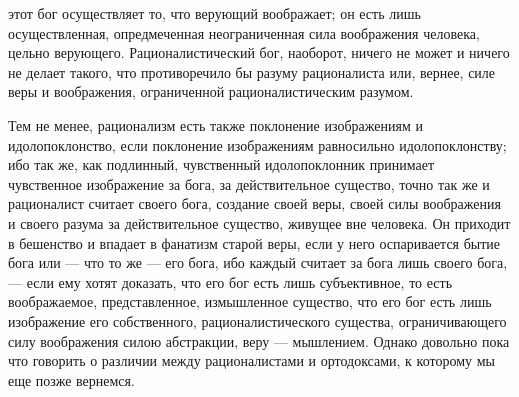 \documentclass[12pt]{article}
\begin{document}
этот бог осуществляет то, что верующий воображает; он есть лишь осуществленная, опредмеченная неограниченная сила воображения человека, цельно верующего. Рационалистический бог, наоборот, ничего не может и ничего не делает такого, что противоречило бы разуму рационалиста или, вернее, силе веры и воображения, ограниченной рационалистическим разумом. 

Тем не менее, рационализм есть также поклонение изображениям и идолопоклонство, если поклонение изображениям равносильно идолопоклонству; ибо так же, как подлинный, чувственный идолопоклонник принимает чувственное изображение за бога, за действительное существо, точно так же и рационалист считает своего бога, создание своей веры, своей силы воображения и своего разума за действительное существо, живущее вне человека. Он приходит в бешенство и впадает в фанатизм старой веры, если у него оспаривается бытие бога или --- что то же --- его бога, ибо каждый считает за бога лишь своего бога, --- если ему хотят доказать, что его бог есть лишь субъективное, то есть воображаемое, представленное, измышленное существо, что его бог есть лишь изображение его собственного, рационалистического существа, ограничивающего силу воображения силою абстракции, веру --- мышлением. Однако довольно пока что говорить о различии между рационалистами и ортодоксами, к которому мы еще позже вернемся. 
\end{document}
